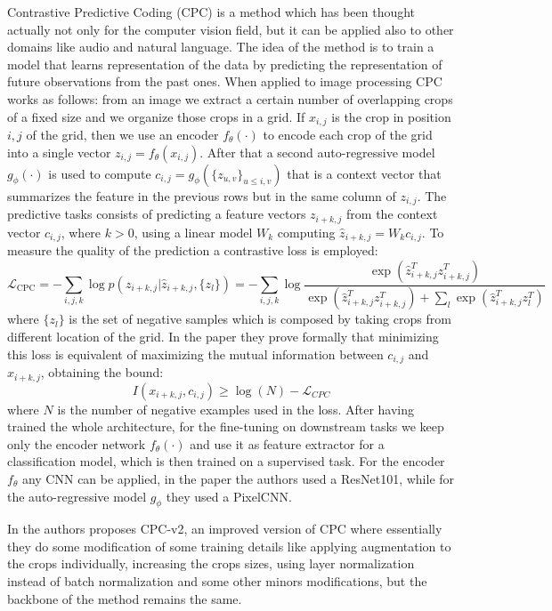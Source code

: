 Contrastive Predictive Coding (CPC) \cite{oord2018representation} is a method which has been thought actually not only for the computer vision field, but it can be applied also to other domains like audio and natural language. The idea of the method is to train a model that learns representation of the data by predicting the representation of future observations from the past ones. When applied to image processing CPC works as follows: from an image we extract a certain number of overlapping crops of a fixed size and we organize those crops in a grid. If $x_{i,j}$ is the crop in position $i, j$ of the grid, then we use an encoder $f_\theta(\cdot)$ to encode each crop of the grid into a single vector $z_{i,j} = f_\theta(x_{i,j})$. After that a second auto-regressive model $g_\phi(\cdot)$ is used to compute $c_{i,j} = g_\phi(\{z_{u,v}\}_{u\le i, v})$ that is a context vector that summarizes the feature in the previous rows but in the same column of $z_{i,j}$. The predictive tasks consists of predicting a feature vectors $z_{i+k,j}$ from the context vector $c_{i,j}$, where $k > 0$, using a linear model $W_k$ computing $\hat{z}_{i+k,j} = W_kc_{i,j}$. To measure the quality of the prediction a contrastive loss is employed:
\[ \mathcal{L}_{\text{CPC}} = -\sum_{i,j,k}\log p(z_{i+k,j}|\hat{z}_{i+k,j}, \{z_l\}) = -\sum_{i,j,k}\log \frac{\exp(\hat{z}^T_{i+k,j}z^T_{i+k,j})}{\exp(\hat{z}^T_{i+k,j}z^T_{i+k,j}) + \sum_l \exp(\hat{z}^T_{i+k,j}z^T_l)}\]
where $\{z_l\}$ is the set of negative samples which is composed by taking crops from different location of the grid. In the paper they prove formally that minimizing this loss is equivalent of maximizing the mutual information between $c_{i,j}$ and $x_{i+k,j}$, obtaining the bound:
\[ I(x_{i+k,j}, c_{i,j}) \ge \log(N) - \mathcal{L}_{CPC}\]
where $N$ is the number of negative examples used in the loss. After having trained the whole architecture, for the fine-tuning on downstream tasks we keep only the encoder network $f_\theta(\cdot)$ and use it as feature extractor for a classification model, which is then trained on a supervised task. For the encoder $f_\theta$ any CNN can be applied, in the paper the authors used a ResNet101, while for the auto-regressive model $g_\phi$ they used a PixelCNN.

In \cite{henaff2020data} the authors proposes CPC-v2, an improved version of CPC where essentially they do some modification of some training details like applying augmentation to the crops individually, increasing the crops sizes, using layer normalization instead of batch normalization and some other minors modifications, but the backbone of the method remains the same.